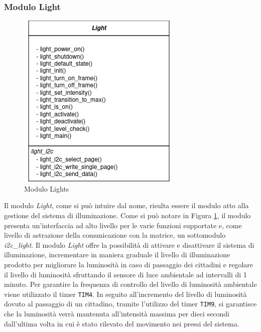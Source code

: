 \documentclass{article}
\begin{document}
	\subsubsection{Modulo Light}
	\begin{figure}[ht]
		\centering
		\includegraphics[scale=0.40]{./images/Light.jpg}
		\caption{Modulo Lights}
		\label{img:lights}
	\end{figure}
	Il modulo \textit{Light}, come si pu\`o intuire dal nome, risulta essere il modulo atto alla gestione del sistema di illuminazione. 
	Come si pu\`o notare in Figura \ref{img:lights}, il modulo presenta un'interfaccia ad alto livello per le varie funzioni supportate e, come livello di astrazione della comunicazione con la matrice, un sottomodulo \textit{i2c\_light}.
	Il modulo \textit{Light} offre la possibilit\`a di attivare e disattivare il sistema di illuminazione, incrementare in maniera graduale il livello di illuminazione prodotto per migliorare la luminosit\`a in caso di passaggio dei cittadini e regolare il livello di luminosit\`a sfruttando il sensore di luce ambientale ad intervalli di 1 minuto.
	Per garantire la frequenza di controllo del livello di luminosit\`a ambientale viene utilizzato il timer \texttt{TIM4}.
	In seguito all'incremento del livello di luminosit\`a dovuto al passaggio di un cittadino, tramite l'utilizzo del timer \texttt{TIM9}, si garantisce che la luminosit\`a verr\`a mantenuta all'intensit\`a massima per dieci secondi dall'ultima volta in cui \`e stato rilevato del movimento nei pressi del sistema.
	
\end{document}
